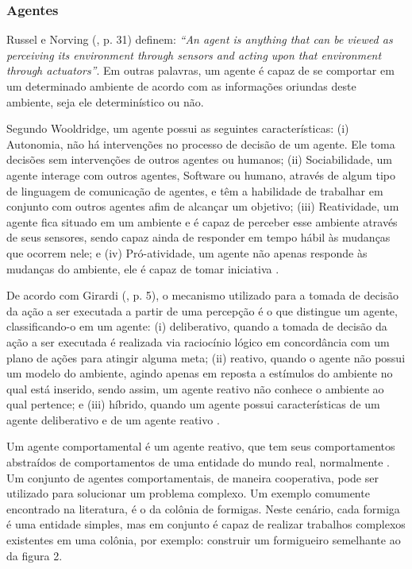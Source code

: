 \subsubsection{Agentes}

Russel e Norving (\citeyear{russel2003}, p. 31) definem: \textit{“An agent is anything that can be viewed as perceiving its environment through sensors and acting upon that environment through actuators”}. Em outras palavras, um agente é capaz de se comportar em um determinado ambiente de acordo com as informações oriundas deste ambiente, seja ele determinístico ou não.

Segundo Wooldridge, um agente possui as seguintes características: (i) Autonomia, não há intervenções no processo de decisão de um agente. Ele toma decisões sem intervenções de outros agentes ou humanos; (ii) Sociabilidade, um agente interage com outros agentes, Software ou humano, através de algum tipo de linguagem de comunicação de agentes, e têm a habilidade de trabalhar em conjunto com outros agentes afim de alcançar um objetivo; (iii) Reatividade, um agente fica situado em um ambiente e é capaz de perceber esse ambiente através de seus sensores, sendo capaz ainda de responder em tempo hábil às mudanças que ocorrem nele; e (iv) Pró-atividade, um agente não apenas responde às mudanças do ambiente, ele é capaz de tomar iniciativa \cite[p. 2-3]{wooldrige2002}.

De acordo com Girardi (\citeyear{girardi2004}, p. 5), o mecanismo utilizado para a tomada de decisão da ação a ser executada a partir de uma percepção é o que distingue um agente, classificando-o em um agente: (i) deliberativo, quando a tomada de decisão da ação a ser executada é realizada via raciocínio lógico em concordância com um plano de ações para atingir alguma meta; (ii) reativo, quando o agente não possui um modelo do ambiente, agindo apenas em reposta a estímulos do ambiente no qual está inserido, sendo assim, um agente reativo não conhece o ambiente ao qual pertence; e (iii) híbrido, quando um agente possui características de um agente deliberativo e de um agente reativo \cite[p. 5]{girardi2004}. 


Um agente comportamental é um agente reativo, que tem seus comportamentos abstraídos de comportamentos de uma entidade do mundo real, normalmente \cite[p. 33]{oliveira2008}. Um conjunto de agentes comportamentais, de maneira cooperativa, pode ser utilizado para solucionar um problema complexo. Um exemplo comumente encontrado na literatura, é o da colônia de formigas. Neste cenário, cada formiga é uma entidade simples, mas em conjunto é capaz de realizar trabalhos complexos existentes em uma colônia, por exemplo: construir um formigueiro semelhante ao da figura 2.

